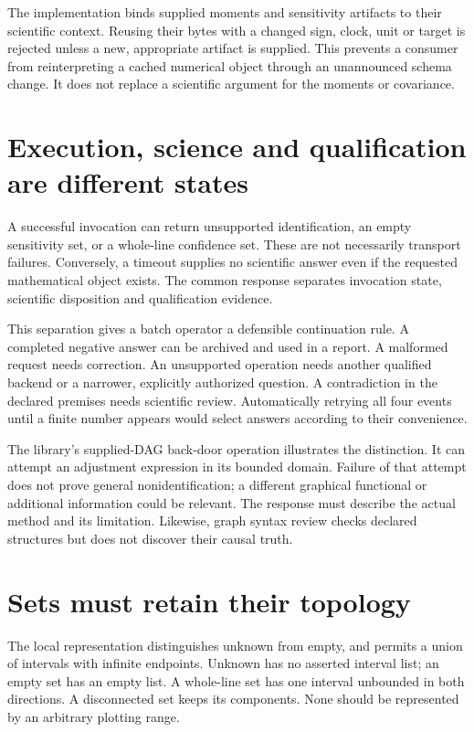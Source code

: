 The implementation binds supplied moments and sensitivity artifacts to their
scientific context. Reusing their bytes with a changed sign, clock, unit or
target is rejected unless a new, appropriate artifact is supplied. This
prevents a consumer from reinterpreting a cached numerical object through an
unannounced schema change. It does not replace a scientific argument for the
moments or covariance. \citep{v12_in_runtime}

\section{Execution, science and qualification are different states}

A successful invocation can return unsupported identification, an empty
sensitivity set, or a whole-line confidence set. These are not necessarily
transport failures. Conversely, a timeout supplies no scientific answer even
if the requested mathematical object exists. The common response separates
invocation state, scientific disposition and qualification evidence.

This separation gives a batch operator a defensible continuation rule. A
completed negative answer can be archived and used in a report. A malformed
request needs correction. An unsupported operation needs another qualified
backend or a narrower, explicitly authorized question. A contradiction in the
declared premises needs scientific review. Automatically retrying all four
events until a finite number appears would select answers according to their
convenience.

The library's supplied-DAG back-door operation illustrates the distinction.
It can attempt an adjustment expression in its bounded domain. Failure of
that attempt does not prove general nonidentification; a different graphical
functional or additional information could be relevant. The response must
describe the actual method and its limitation. Likewise, graph syntax review
checks declared structures but does not discover their causal truth.
\citep{v12_in_runtime}

\section{Sets must retain their topology}

The local representation distinguishes unknown from empty, and permits a union
of intervals with infinite endpoints. Unknown has no asserted interval list;
an empty set has an empty list. A whole-line set has one interval unbounded in
both directions. A disconnected set keeps its components. \citep{v12_in_contract}
None should be represented by an arbitrary plotting range.


